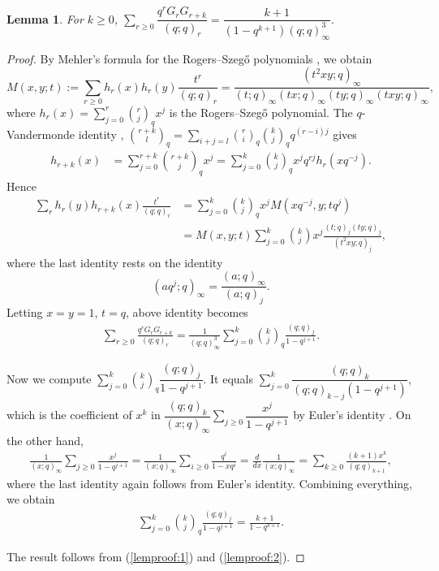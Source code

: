 \documentclass[11pt]{amsart}
\newtheorem{lemma}[theorem]{Lemma}
\theoremstyle{definition}
\theoremstyle{remark}
\begin{document}
\begin{lemma}\label{lem:keyidentity}
For $k\geq 0$, $\displaystyle\sum_{r\geq 0}\dfrac{q^rG_rG_{r+k}}{(q;q)_r}=\dfrac{k+1}{(1-q^{k+1})(q;q)^3_{\infty}}.$
\end{lemma}
\begin{proof}
By Mehler's formula for the Rogers--Szeg\H{o} polynomials
\cite[Chapter 3, Example 9, p. 50]{Andrews},
we obtain	
\[M(x,y;t):=\sum_{r\geq 0}h_r(x)h_r(y)\frac{t^r}{(q;q)_r}=\frac{(t^2xy;q)_{\infty}}{(t;q)_{\infty}(tx;q)_{\infty}(ty;q)_{\infty}(txy;q)_{\infty}},\]
where $h_r(x)=\sum_{j=0}^r\binom{r}{j}_qx^j$ is the Rogers--Szeg\H{o} polynomial. 
The $q$-Vandermonde identity
\cite[(3.3.10), p. 37]{Andrews}, $\binom{r+k}{l}_q=\sum_{i+j=l}\binom{r}{i}_q\binom{k}{j}_qq^{(r-i)j}$ gives
\begin{align*}
h_{r+k}(x)&=\sum_{j=0}^{r+k}\binom{r+k}{j}_qx^j=\sum_{j=0}^{k}\binom{k}{j}_qx^jq^{rj}h_{r}(xq^{-j}). 
\end{align*}
Hence
\begin{align*}
\sum_{r}h_{r}(y)h_{r+k}(x)\frac{t^r}{(q;q)_r}&=\sum_{j=0}^{k}\binom{k}{j}_qx^jM(xq^{-j},y;tq^j)\\
&=M(x,y;t)\sum_{j=0}^k\binom{k}{j}x^j\frac{(t;q)_j (ty;q)_j}{(t^2xy;q)_j},	
\end{align*}
where the last identity rests on the identity
\[(aq^j;q)_\infty=\frac{(a;q)_\infty}{(a;q)_j}.\]
Letting $x=y=1$, $t=q$, above identity becomes 
\begin{align}\label{lemproof:1}
\sum_{r\geq 0}\frac{q^rG_rG_{r+k}}{(q;q)_r}=\frac{1}{(q;q)_{\infty}^3}\sum_{j=0}^k\binom{k}{j}_q \frac{(q;q)_j}{1-q^{j+1}}.	
\end{align}

Now we compute $\displaystyle \sum_{j=0}^{k}\binom{k}{j}_q \dfrac{(q;q)_j}{1-q^{j+1}}$. It equals $\displaystyle \sum_{j=0}^{k}\dfrac{(q;q)_k}{(q;q)_{k-j}(1-q^{j+1})}$, which is the coefficient of $x^k$ in $\displaystyle \dfrac{(q;q)_k}{(x;q)_{\infty}}\sum_{j\geq 0} \dfrac{x^j}{1-q^{j+1}}$ by Euler's identity \cite[(2.2.5), p. 19]{Andrews}.
On the other hand, 
\begin{align*}
\frac{1}{(x;q)_\infty}\sum_{j\geq 0}\frac{x^j}{1-q^{j+1}}=\frac{1}{(x;q)_{\infty}}\sum_{i\geq 0} \frac{q^i}{1-xq^i}=\frac{d}{dx}\frac{1}{(x;q)_{\infty}}=\sum_{k\geq 0}\frac{(k+1)x^k}{(q;q)_{k+1}},	
\end{align*}
where the last identity again follows from Euler's identity. Combining everything, we obtain
\begin{align}\label{lemproof:2}
\sum_{j=0}^{k}\binom{k}{j}_q\frac{(q;q)_j}{1-q^{j+1}}=\frac{k+1}{1-q^{k+1}}. 	
\end{align}

The result follows from (\ref{lemproof:1}) and (\ref{lemproof:2}).  
\end{proof}
\end{document}
